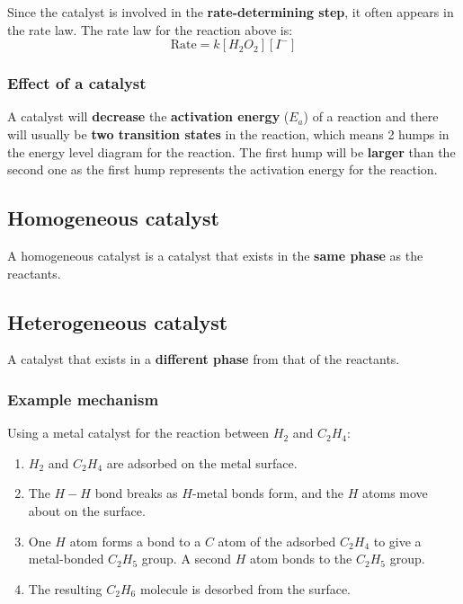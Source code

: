 \documentclass[11pt]{article}
\begin{document}
Since the catalyst is involved in the \textbf{rate-determining step}, it often appears in the rate law. The rate law for the reaction above is:
\[\text{Rate} = k[H_2O_2][I^-]\]

\subsubsection{Effect of a catalyst}
\label{sec:orgf4ef968}
A catalyst will \textbf{decrease} the \textbf{activation energy} (\(E_a\)) of a reaction and there will usually be \textbf{two transition states} in the reaction, which means 2 humps in the energy level diagram for the reaction. The first hump will be \textbf{larger} than the second one as the first hump represents the activation energy for the reaction.

\subsection{Homogeneous catalyst}
\label{sec:org8f8dcbb}
A homogeneous catalyst is a catalyst that exists in the \textbf{same phase} as the reactants.

\newpage

\subsection{Heterogeneous catalyst}
\label{sec:org26f8a45}
A catalyst that exists in a \textbf{different phase} from that of the reactants.

\subsubsection{Example mechanism}
\label{sec:org24b3b06}
Using a metal catalyst for the reaction between \(H_2\) and \(C_2H_4\):

\begin{enumerate}
\item \(H_2\) and \(C_2H_4\) are adsorbed on the metal surface.
\item The \(H-H\) bond breaks as \(H\)-metal bonds form, and the \(H\) atoms move about on the surface.
\item One \(H\) atom forms a bond to a \(C\) atom of the adsorbed \(C_2H_4\) to give a metal-bonded \(C_2H_5\) group. A second \(H\) atom bonds to the \(C_2H_5\) group.
\item The resulting \(C_2H_6\) molecule is desorbed from the surface.
\end{enumerate}
\end{document}
